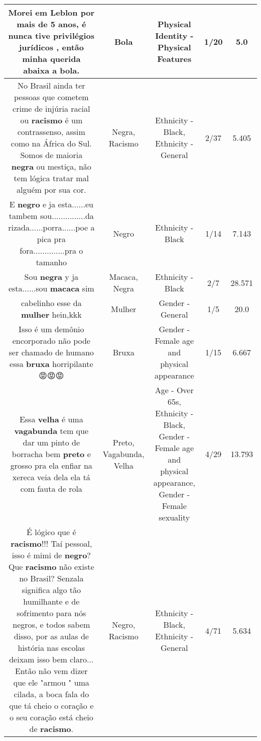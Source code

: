 \documentclass[11pt]{article}
\newlength\mylength
\begin{document}
\begin{center}
\begin{longtable}{|C{.65\mylength}|C{.30\mylength}|C{.12\mylength}|C{.12\mylength}|C{.12\mylength}|}
  \small Morei em Leblon por mais de 5 anos, é nunca tive privilégios jurídicos , então minha querida abaixa a \textbf{bola}.\normalsize   & Bola & Physical Identity - Physical Features & 1/20 & 5.0 \\  \hline
  \small No Brasil ainda ter pessoas que cometem crime de injúria racial ou \textbf{racismo} é um contrassenso, assim como na África do Sul. Somos de maioria \textbf{negra} ou mestiça, não tem lógica tratar mal alguém por sua cor.\normalsize   & Negra, Racismo & Ethnicity - Black, Ethnicity - General & 2/37 & 5.405 \\  \hline
  \small E \textbf{negro} e ja esta......eu tambem sou...............da rizada......porra......poe a pica pra fora..............pra o tamanho\normalsize   & Negro & Ethnicity - Black & 1/14 & 7.143 \\  \hline
  \small Sou \textbf{negra} y ja esta......sou \textbf{macaca} sim\normalsize   & Macaca, Negra & Ethnicity - Black & 2/7 & 28.571 \\  \hline
  \small cabelinho esse da \textbf{mulher} hein,kkk\normalsize   & Mulher & Gender - General & 1/5 & 20.0 \\  \hline
  \small Isso é um demônio encorporado não pode ser chamado de humano essa \textbf{bruxa} horripilante 😡😡😡\normalsize   & Bruxa & Gender - Female age and physical appearance & 1/15 & 6.667 \\  \hline
  \small Essa \textbf{v\textbf{elha}} é uma \textbf{vagabunda} tem que dar um pinto de borracha bem \textbf{preto} e grosso pra ela enfiar na xereca veia dela ela tá com fauta de rola\normalsize   & Preto, Vagabunda, Velha & Age - Over 65s, Ethnicity - Black, Gender - Female age and physical appearance, Gender - Female sexuality & 4/29 & 13.793 \\  \hline
  \small É lógico que é \textbf{racismo}!!!  Taí pessoal, isso é mimi de \textbf{negro}?  Que \textbf{racismo} não existe no Brasil? Senzala significa algo tão humilhante e de sofrimento para nós negros,  e todos sabem disso, por as aulas de história nas escolas deixam isso bem claro... Então não vem dizer que ele "armou " uma cilada,  a boca fala do que tá cheio o coração e o seu coração está cheio de \textbf{racismo}.\normalsize   & Negro, Racismo & Ethnicity - Black, Ethnicity - General & 4/71 & 5.634 \\  \hline

\end{longtable}
\end{center}
\end{document}
